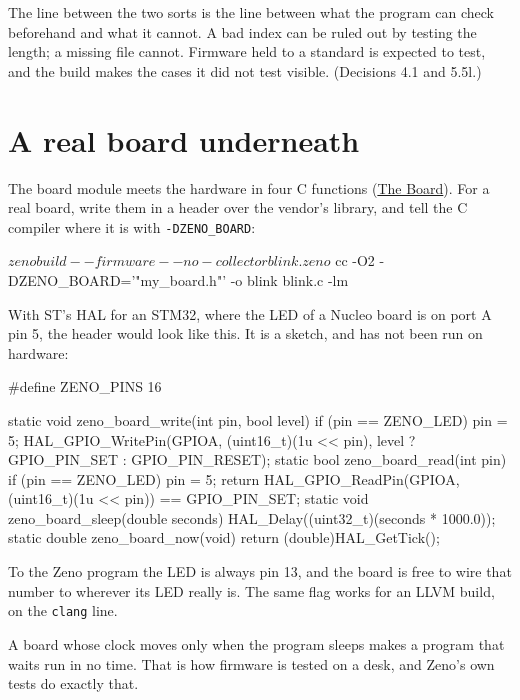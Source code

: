 \begin{why}
The line between the two sorts is the line between what the program
can check beforehand and what it cannot. A bad index can be ruled out
by testing the length; a missing file cannot. Firmware held to a
standard is expected to test, and the build makes the cases it did not
test visible. (Decisions 4.1 and 5.5l.)
\end{why}

\section{A real board underneath}

The board module meets the hardware in four C functions
(\hyperref[ch-board]{The Board}). For a real board, write them in a
header over the vendor's library, and tell the C compiler where it is
with \verb|-DZENO_BOARD|:

\begin{zenofrag}[lang=shell]
$ zeno build --firmware --no-collector blink.zeno
$ cc -O2 -DZENO_BOARD='"my_board.h"' -o blink blink.c -lm
\end{zenofrag}

With ST's HAL for an STM32, where the LED of a Nucleo board is on port
A pin 5, the header would look like this. It is a sketch, and has not
been run on hardware:

\begin{zenofrag}[lang=shell]
#define ZENO_PINS 16

static void zeno_board_write(int pin, bool level) {
    if (pin == ZENO_LED) pin = 5;
    HAL_GPIO_WritePin(GPIOA, (uint16_t)(1u << pin),
                      level ? GPIO_PIN_SET : GPIO_PIN_RESET);
}
static bool zeno_board_read(int pin) {
    if (pin == ZENO_LED) pin = 5;
    return HAL_GPIO_ReadPin(GPIOA, (uint16_t)(1u << pin)) == GPIO_PIN_SET;
}
static void zeno_board_sleep(double seconds) {
    HAL_Delay((uint32_t)(seconds * 1000.0));
}
static double zeno_board_now(void) { return (double)HAL_GetTick(); }
\end{zenofrag}

To the Zeno program the LED is always pin 13, and the board is free to
wire that number to wherever its LED really is. The same flag works for
an LLVM build, on the \verb|clang| line.

A board whose clock moves only when the program sleeps makes a program
that waits run in no time. That is how firmware is tested on a desk,
and Zeno's own tests do exactly that.

